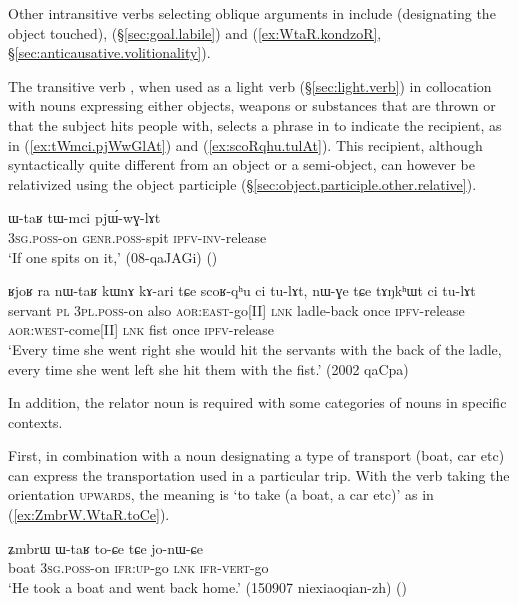 Other intransitive verbs selecting oblique arguments in  include  (designating the object touched),  (§\ref{sec:goal.labile}) and  (\ref{ex:WtaR.kondzoR}, §\ref{sec:anticausative.volitionality}).

The transitive verb , when used as a light verb (§\ref{sec:light.verb}) in collocation with nouns expressing either objects, weapons or substances that are thrown or that the subject hits people with, selects a phrase in  to indicate the recipient, as in (\ref{ex:tWmci.pjWwGlAt}) and (\ref{ex:scoRqhu.tulAt}). This recipient, although syntactically quite different from an object or a semi-object, can however be relativized using the object participle (§\ref{sec:object.participle.other.relative}).

\begin{exe}
\ex \label{ex:tWmci.pjWwGlAt}
\gll ɯ-taʁ tɯ-mci pjɯ́-wɣ-lɤt \\
\textsc{3sg}.\textsc{poss}-on \textsc{genr}.\textsc{poss}-spit \textsc{ipfv}-\textsc{inv}-release \\
\glt `If one spits on it,' (08-qaJAGi) ()
\end{exe}

\begin{exe}
\ex \label{ex:scoRqhu.tulAt}
\gll ʁjoʁ ra nɯ-taʁ kɯnɤ kɤ-ari tɕe scoʁ-qʰu ci tu-lɤt, nɯ-ɣe tɕe tɤŋkʰɯt ci tu-lɤt \\
servant \textsc{pl} \textsc{3pl}.\textsc{poss}-on also \textsc{aor}:\textsc{east}-go[II] \textsc{lnk} ladle-back once \textsc{ipfv}-release \textsc{aor}:\textsc{west}-come[II] \textsc{lnk} fist once \textsc{ipfv}-release \\
\glt `Every time she went right she would hit the servants with the back of the ladle, every time she went left she hit them with the fist.' (2002 qaCpa)
\end{exe} 

In addition, the relator noun  is required with some categories of nouns in specific contexts.

First,  in combination with a noun designating a type of transport (boat, car etc) can express the transportation used in a particular trip. With the verb  taking the orientation \textsc{upwards}, the meaning is `to take (a boat, a car etc)' as in (\ref{ex:ZmbrW.WtaR.toCe}). 

\begin{exe}
\ex \label{ex:ZmbrW.WtaR.toCe}
\gll ʑmbrɯ ɯ-taʁ to-ɕe tɕe jo-nɯ-ɕe \\
boat \textsc{3sg}.\textsc{poss}-on \textsc{ifr}:\textsc{up}-go \textsc{lnk} \textsc{ifr}-\textsc{vert}-go \\
\glt `He took a boat and went back home.' (150907 niexiaoqian-zh) ()
\end{exe} 


